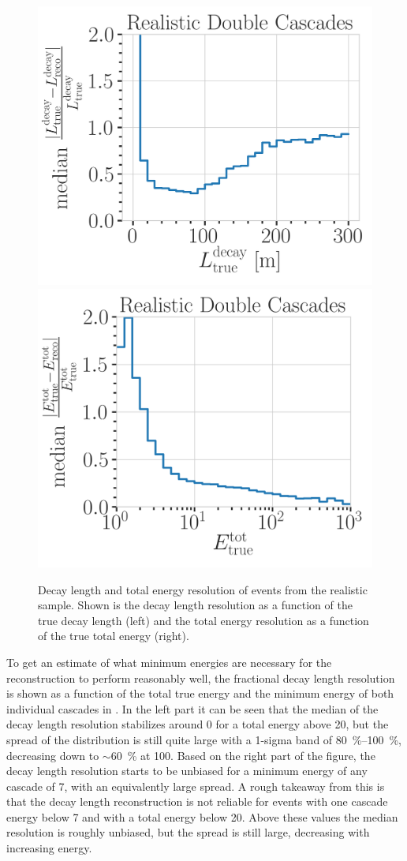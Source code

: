 \begin{figure}[h]
	\centering
    \includegraphics[width=0.49\linewidth]{figures/model_independent_simulation/results/realistic/resolutions/194603_median_decay_length_resolution_goodfit_log_unweighted.png}
    \includegraphics[width=0.49\linewidth]{figures/model_independent_simulation/results/realistic/resolutions/194603_median_absolute_fractional_reco_total_energy_error_goodfit.png} 
    \caption[Realistic double cascade decay length and total energy resolution]{Decay length and total energy resolution of events from the realistic sample. Shown is the decay length resolution as a function of the true decay length (left) and the total energy resolution as a function of the true total energy (right).}
\end{figure}

To get an estimate of what minimum energies are necessary for the reconstruction to perform reasonably well, the fractional decay length resolution is shown as a function of the total true energy and the minimum energy of both individual cascades in . In the left part it can be seen that the median of the decay length resolution stabilizes around 0 for a total energy above \SI{20}{\gev}, but the spread of the distribution is still quite large with a 1-sigma band of \SIrange{80}{100}{\percent}, decreasing down to $\sim$\SI{60}{\percent} at \SI{100}{\gev}. Based on the right part of the figure, the decay length resolution starts to be unbiased for a minimum energy of any cascade of \SI{7}{\gev}, with an equivalently large spread. A rough takeaway from this is that the decay length reconstruction is not reliable for events with one cascade energy below \SI{7}{\gev} and with a total energy below \SI{20}{\gev}. Above these values the median resolution is roughly unbiased, but the spread is still large, decreasing with increasing energy.

